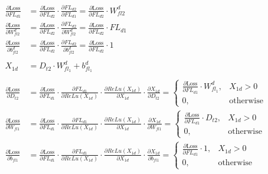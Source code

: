 \documentclass[12pt,letterpaper]{article}
\begin{document}
\begin{align*}
\frac{\partial \text{Loss}}{\partial FL_{d1}} &= %
\frac{\partial \text{Loss}}{\partial FL_{d2}} \cdot 
\frac{\partial FL_{d2}}{\partial FL_{d1}}=
\frac{\partial \text{Loss}}{\partial FL_{d2}}\cdot W^d_{fl2}
\\
\frac{\partial \text{Loss}}{\partial W^d_{fl2}} &= %
\frac{\partial \text{Loss}}{\partial FL_{d2}} \cdot 
\frac{\partial FL_{d2}}{\partial W^d_{fl2}}=
\frac{\partial \text{Loss}}{\partial FL_{d2}}\cdot FL_{d1}
\\
\frac{\partial \text{Loss}}{\partial b^d_{fl2}} &= %
\frac{\partial \text{Loss}}{\partial FL_{d2}} \cdot 
\frac{\partial FL_{d2}}{\partial b^d_{fl2}}=
\frac{\partial \text{Loss}}{\partial FL_{d2}}\cdot 1
\\\\
X_{1d}&=D_{t2} \cdot W^d_{fl_1} + b^d_{fl_1}
\\\\
\frac{\partial \text{Loss}}{\partial D_{t2}} &= %
\frac{\partial \text{Loss}}{\partial FL_{d1}} \cdot
\frac{\partial FL_{d1}}{\partial ReLu(X_{1d})} \cdot
\frac{\partial ReLu(X_{1d})}{\partial X_{1d}} \cdot
\frac{\partial X_{1d}}{\partial D_{t2}}=
 \begin{cases}
    \frac{\partial \text{Loss}}{\partial FL_{d1}} \cdot W^d_{fl_1}, & X_{1d} > 0 \\
    0, & \text{otherwise}
    \end{cases} 
    \\
\frac{\partial \text{Loss}}{\partial W_{fl1}} &= %
\frac{\partial \text{Loss}}{\partial FL_{d1}} \cdot
\frac{\partial FL_{d1}}{\partial ReLu(X_{1d} )} \cdot
\frac{\partial ReLu(X_{1d} )}{\partial X_{1d} } \cdot
\frac{\partial X_{1d} }{\partial W_{fl1}}=
 \begin{cases}
    \frac{\partial \text{Loss}}{\partial FL_{d1}} \cdot D_{t2}, & X_{1d} > 0 \\
    0, & \text{otherwise}
    \end{cases}\\
\frac{\partial \text{Loss}}{\partial b_{fl1}} &= %
\frac{\partial \text{Loss}}{\partial FL_{d1}} \cdot
\frac{\partial FL_{d1}}{\partial ReLu(X_{1d} )} \cdot
\frac{\partial ReLu(X_{1d} )}{\partial X_{1d} } \cdot
\frac{\partial X_{1d} }{\partial b_{fl1}}=
 \begin{cases}
    \frac{\partial \text{Loss}}{\partial FL_{d1}} \cdot 1, & X_{1d} > 0 \\
    0, & \text{otherwise}
    \end{cases} 
\\%

\end{align*}
\end{document}
